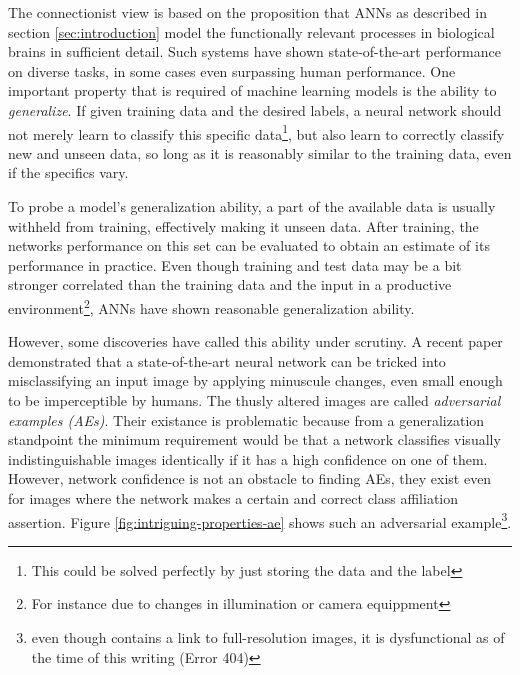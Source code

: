 \documentclass[11pt, a4paper]{article}
\begin{document}
The connectionist view is based on the proposition that ANNs as described in section \ref{sec:introduction} model the functionally relevant processes in biological brains in sufficient detail. Such systems have shown state-of-the-art performance on diverse tasks, in some cases even surpassing human performance. One important property that is required of machine learning models is the ability to \emph{generalize}. If given training data and the desired labels, a neural network should not merely learn to classify this specific data\footnote{This could be solved perfectly by just storing the data and the label}, but also learn to correctly classify new and unseen data, so long as it is reasonably similar to the training data, even if the specifics vary.

To probe a model's generalization ability, a part of the available data is usually withheld from training, effectively making it unseen data. After training, the networks performance on this set can be evaluated to obtain an estimate of its performance in practice. Even though training and test data may be a bit stronger correlated than the training data and the input in a productive environment\footnote{For instance due to changes in illumination or camera equippment}, ANNs have shown reasonable generalization ability.

However, some discoveries have called this ability under scrutiny. A recent paper \cite{intriguing-properties-of-neural-networks} demonstrated that a state-of-the-art neural network can be tricked into misclassifying an input image by applying minuscule changes, even small enough to be imperceptible by humans. The thusly altered images are called \emph{adversarial examples (AEs)}. Their existance is problematic because from a generalization standpoint the minimum requirement would be that a network classifies visually indistinguishable images identically if it has a high confidence on one of them. However, network confidence is not an obstacle to finding AEs, they exist even for images where the network makes a certain and correct class affiliation assertion. Figure \ref{fig:intriguing-properties-ae} shows such an adversarial example\footnote{even though \cite{intriguing-properties-of-neural-networks} contains a link to full-resolution images, it is dysfunctional as of the time of this writing (Error 404)}.
\end{document}
